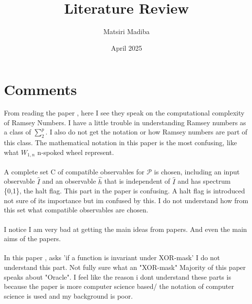 \documentclass[12pt, a4paper]{Assignment}
\author{Matsiri Madiba}
\date{April 2025}
\title{Literature Review}
\begin{document}
\maketitle
\section*{Comments}

From reading the paper \cite{burr1981generalized}, here I see they speak on the computational complexity of Ramsey Numbers. 
I have a little trouble in understanding Ramsey numbers as a class of $\sum_{2}^{p}$. 
I also do not get the notation or how Ramsey numbers are part of this class.
The mathematical notation in this paper is the most confusing, like what $W_{1,n}$ n-spoked wheel represent.
\\
\\
\cite{Deutsch1989}
A complete set C of compatible observables for $\mathcal{P}$ is chosen, including an input 
observable $\hat{I}$ and an observable $\hat{h}$ that is independent of $\hat{I}$ and has spectrum \{0,1\}, the halt flag. 
This part in the paper is confusing.
A halt flag is introduced not sure of its importance but im confused by this.
I do not understand how from this set what compatible observables are chosen.
\\
\\
I notice I am very bad at getting the main ideas from papers.
And even the main aims of the papers.
\\
\\
In this paper \cite{doi:10.1137/S0097539796298637}, asks 'if a function is invariant under XOR-mask' I do not understand this part.
Not fully sure what an "XOR-mask"
Majority of this paper speaks about "Oracle".
I feel like the reason i dont understand these parts is because the paper is more computer science based/ the notation of computer science is used and my background is poor.
\end{document}
